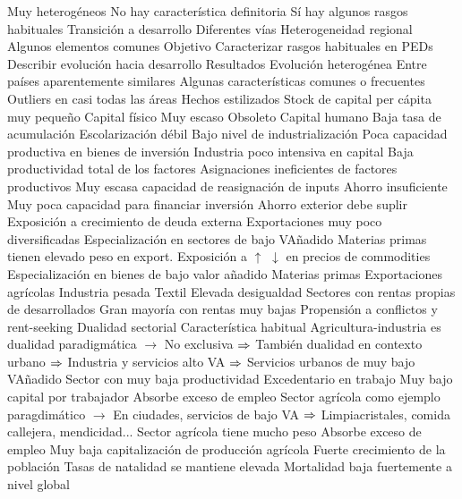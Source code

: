 \documentclass{nuevotema}
\begin{document}
\begin{esquemal}
				\4[] Muy heterogéneos
				\4[] No hay característica definitoria
				\4[] Sí hay algunos rasgos habituales
				\4 Transición a desarrollo
				\4[] Diferentes vías
				\4[] Heterogeneidad regional
				\4[] Algunos elementos comunes
			\3 Objetivo
				\4 Caracterizar rasgos habituales en PEDs
				\4 Describir evolución hacia desarrollo
			\3 Resultados
				\4 Evolución heterogénea
				\4[] Entre países aparentemente similares
				\4 Algunas características comunes o frecuentes
				\4 Outliers en casi todas las áreas
		\2 Hechos estilizados
			\3 Stock de capital per cápita muy pequeño
				\4 Capital físico
				\4[] Muy escaso
				\4[] Obsoleto
				\4 Capital humano
				\4[] Baja tasa de acumulación
				\4[] Escolarización débil
			\3 Bajo nivel de industrialización
				\4 Poca capacidad productiva en bienes de inversión
				\4 Industria poco intensiva en capital
			\3 Baja productividad total de los factores
				\4 Asignaciones ineficientes de factores productivos
				\4 Muy escasa capacidad de reasignación de inputs
			\3 Ahorro insuficiente
				\4 Muy poca capacidad para financiar inversión
				\4 Ahorro exterior debe suplir
				\4[] Exposición a crecimiento de deuda externa
			\3 Exportaciones muy poco diversificadas
				\4 Especialización en sectores de bajo VAñadido
				\4 Materias primas tienen elevado peso en export.
				\4 Exposición a $\uparrow$ $\downarrow$ en precios de commodities
			\3 Especialización en bienes de bajo valor añadido
				\4 Materias primas
				\4 Exportaciones agrícolas
				\4 Industria pesada
				\4 Textil
			\3 Elevada desigualdad
				\4 Sectores con rentas propias de desarrollados
				\4 Gran mayoría con rentas muy bajas
				\4 Propensión a conflictos y rent-seeking
			\3 Dualidad sectorial
				\4 Característica habitual
				\4[] Agricultura-industria es dualidad paradigmática
				\4[] $\to$ No exclusiva
				\4[] $\Rightarrow$ También dualidad en contexto urbano
				\4[] $\Rightarrow$ Industria y servicios alto VA
				\4[] $\Rightarrow$ Servicios urbanos de muy bajo VAñadido
				\4 Sector con muy baja productividad
				\4[] Excedentario en trabajo
				\4[] Muy bajo capital por trabajador
				\4[] Absorbe exceso de empleo
				\4[] Sector agrícola como ejemplo paragdimático
				\4[] $\to$ En ciudades, servicios de bajo VA
				\4[] $\Rightarrow$ Limpiacristales, comida callejera, mendicidad...
			\3 Sector agrícola tiene mucho peso
				\4 Absorbe exceso de empleo
				\4 Muy baja capitalización de producción agrícola
			\3 Fuerte crecimiento de la población
				\4 Tasas de natalidad se mantiene elevada
				\4 Mortalidad baja fuertemente a nivel global

\end{esquemal}
\end{document}
